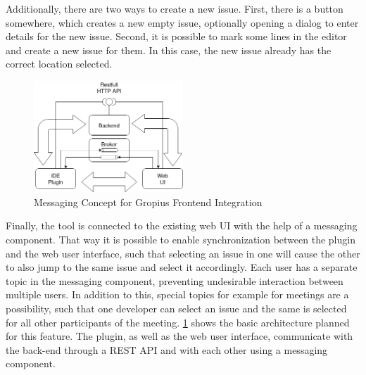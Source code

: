 Additionally, there are two ways to create a new issue.
First, there is a button somewhere, which creates a new empty issue, 
optionally opening a dialog to enter details for the new issue.
Second, it is possible to mark some lines in the editor and create a new issue for them.
In this case, the new issue already has the correct location selected.

\begin{figure}[!h]
	\centering
	\includegraphics[width=0.5\textwidth]{graphics/concept_gropius_frontend_messaging.png}
	\caption{Messaging Concept for Gropius Frontend Integration}
	\label{fig:c3:concept_gropius_messaging}
\end{figure}

Finally, the tool is connected to the existing web \gls{UI} with the help of a messaging component.
That way it is possible to enable synchronization between the plugin and the web user interface, 
such that selecting an issue in one will cause the other to also jump to the same issue and select it accordingly. 
Each user has a separate topic in the messaging component, preventing undesirable interaction between multiple users. 
In addition to this, special topics for example for meetings are a possibility, 
such that one developer can select an issue and the same is selected for all other participants of the meeting. 
\cref{fig:c3:concept_gropius_messaging} shows the basic architecture planned for this feature. 
The plugin, as well as the web user interface, communicate with the back-end through a \gls{REST} \gls{API} and with each other using a messaging component.
